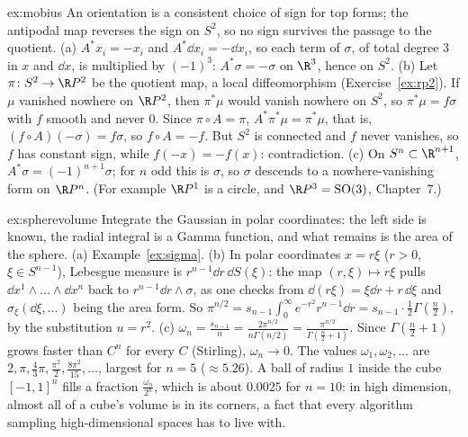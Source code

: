 \begin{solution}{ex:mobius}
\idea An orientation is a consistent choice of sign for top forms; the antipodal map reverses the sign on $S^2$, so no sign survives the passage to the quotient.
\writeup (a) $A^*x_i=-x_i$ and $A^*\dd x_i=-\dd x_i$, so each term of $\sigma$, of total degree $3$ in $x$ and $\dd x$, is multiplied by $(-1)^3$: $A^*\sigma=-\sigma$ on $\R^3$, hence on
$S^2$. (b) Let $\pi\colon S^2\to\R P^2$ be the quotient map, a local diffeomorphism (Exercise~\ref{ex:rp2}). If $\mu$ vanished nowhere on $\R P^2$, then $\pi^*\mu$ would vanish nowhere on $S^2$, so
$\pi^*\mu=f\sigma$ with $f$ smooth and never $0$. Since $\pi\circ A=\pi$, $A^*\pi^*\mu=\pi^*\mu$, that is, $(f\circ A)(-\sigma)=f\sigma$, so $f\circ A=-f$. But $S^2$ is connected and $f$ never vanishes,
so $f$ has constant sign, while $f(-x)=-f(x)$: contradiction. (c) On $S^n\subset\R^{n+1}$, $A^*\sigma=(-1)^{n+1}\sigma$; for $n$ odd this is $\sigma$, so $\sigma$ descends to a
nowhere-vanishing form on $\R P^n$. (For example $\R P^1$ is a circle, and $\R P^3=\mathrm{SO}(3)$, Chapter~7.)
\end{solution}

\begin{solution}{ex:spherevolume}
\idea Integrate the Gaussian in polar coordinates: the left side is known, the radial integral is a Gamma function, and what remains is the area of the sphere.
\writeup (a) Example~\ref{ex:sigma}. (b) In polar coordinates $x=r\xi$ ($r>0$, $\xi\in S^{n-1}$), Lebesgue measure is $r^{n-1}\dd r\,\dd S(\xi)$: the map
$(r,\xi)\mapsto r\xi$ pulls $\dd x^1\wedge\dots\wedge\dd x^n$ back to $r^{n-1}\dd r\wedge\sigma$, as one checks from $\dd(r\xi)=\xi\dd r+r\,\dd\xi$ and $\sigma_\xi(\dd\xi,\dots)$ being the area form.
So $\pi^{n/2}=s_{n-1}\int_0^\infty e^{-r^2}r^{n-1}\dd r=s_{n-1}\cdot\frac12\Gamma(\frac n2)$, by the substitution $u=r^2$. (c) $\omega_n=\frac{s_{n-1}}n=\frac{2\pi^{n/2}}{n\Gamma(n/2)}=\frac{\pi^{n/2}}{\Gamma(\frac n2+1)}$.
Since $\Gamma(\frac n2+1)$ grows faster than $C^n$ for every $C$ (Stirling), $\omega_n\to0$. The values $\omega_1,\omega_2,\dots$ are $2,\pi,\frac43\pi,\frac{\pi^2}2,\frac{8\pi^2}{15},\dots$, largest for
$n=5$ ($\approx5.26$). A ball of radius $1$ inside the cube $[-1,1]^n$ fills a fraction $\frac{\omega_n}{2^n}$, which is about $0.0025$ for $n=10$: in high dimension, almost
all of a cube's volume is in its corners, a fact that every algorithm sampling high-dimensional spaces has to live with.
\end{solution}

